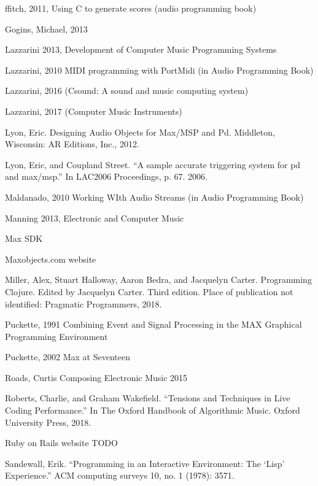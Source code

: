 \documentclass[letterpaper,10pt,english]{sphinxmanual}
\begin{document}
\sphinxAtStartPar
ffitch, 2011, Using C to generate scores (audio programming book)

\sphinxAtStartPar
Gogins, Michael, 2013

\sphinxAtStartPar
Lazzarini 2013, Development of Computer Music Programming Systems

\sphinxAtStartPar
Lazzarini, 2010 \sphinxhyphen{} MIDI programming with PortMidi (in Audio Programming Book)

\sphinxAtStartPar
Lazzarini, 2016 (Csound: A sound and music computing system)

\sphinxAtStartPar
Lazzarini, 2017 (Computer Music Instruments)

\sphinxAtStartPar
Lyon, Eric. Designing Audio Objects for Max/MSP and Pd. Middleton, Wisconsin: A\sphinxhyphen{}R Editions, Inc., 2012.

\sphinxAtStartPar
Lyon, Eric, and Coupland Street. “A sample accurate triggering system for pd and max/msp.” In LAC2006 Proceedings, p. 67. 2006.

\sphinxAtStartPar
Maldanado, 2010 Working WIth Audio Streams (in Audio Programming Book)

\sphinxAtStartPar
Manning 2013, Electronic and Computer Music

\sphinxAtStartPar
Max SDK

\sphinxAtStartPar
Maxobjects.com website

\sphinxAtStartPar
Miller, Alex, Stuart Halloway, Aaron Bedra, and Jacquelyn Carter. Programming Clojure. Edited by Jacquelyn Carter. Third edition. Place of publication not identified: Pragmatic Programmers, 2018.

\sphinxAtStartPar
Puckette, 1991 \sphinxhyphen{} Combining Event and Signal Processing in the MAX Graphical Programming Environment

\sphinxAtStartPar
Puckette, 2002 \sphinxhyphen{} Max at Seventeen

\sphinxAtStartPar
Roads, Curtis \sphinxhyphen{} Composing Electronic Music 2015

\sphinxAtStartPar
Roberts, Charlie, and Graham Wakefield. “Tensions and Techniques in Live Coding Performance.” In The Oxford Handbook of Algorithmic Music. Oxford University Press, 2018.

\sphinxAtStartPar
Ruby on Rails website TODO

\sphinxAtStartPar
Sandewall, Erik. “Programming in an Interactive Environment: The ‘Lisp’ Experience.” ACM computing surveys 10, no. 1 (1978): 35\textendash{}71.
\end{document}
